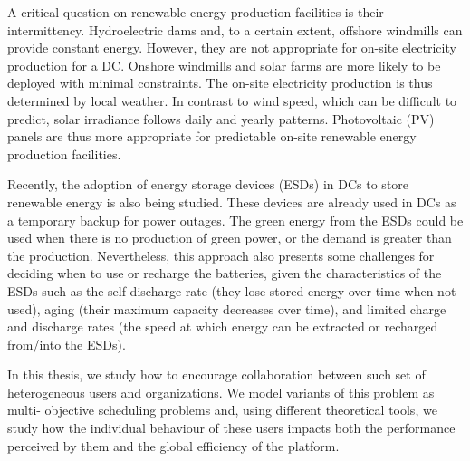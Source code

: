 A critical question on renewable energy production facilities is their
intermittency. Hydroelectric dams and, to a certain extent, offshore
windmills can provide constant energy. However, they are not
appropriate for on-site electricity production for a DC. Onshore
windmills and solar farms are more likely to be deployed with minimal
constraints. The on-site electricity production is thus determined by
local weather. In contrast to wind speed, which can be difficult to
predict, solar irradiance follows daily and yearly
patterns. Photovoltaic (PV) panels are thus more appropriate for
predictable on-site renewable energy production facilities.


Recently, the adoption of energy storage devices (ESDs) in DCs to store renewable energy \cite{wang2012_EDCS} is also being studied. These devices are already used in DCs as a temporary backup for power outages. The green energy from the ESDs could be used when there is no production of green power, or the demand is greater than the production. Nevertheless, this approach also presents some challenges for deciding when to use or recharge the batteries, given the characteristics of the ESDs such as the self-discharge rate (they lose stored energy over time when not used), aging (their maximum capacity decreases over time), and limited charge and discharge rates (the speed at which energy can be extracted or recharged from/into the ESDs).



In this thesis, we study how to encourage collaboration between such set of
heterogeneous users and organizations. We model variants of this problem as multi-
objective scheduling problems and, using different theoretical tools, we study how
the individual behaviour of these users impacts both the performance perceived by
them and the global efficiency of the platform.





